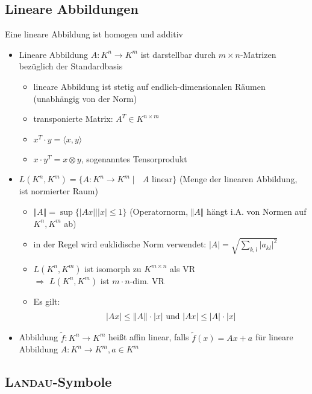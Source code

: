 \subsection{Lineare Abbildungen}
Eine lineare Abbildung ist homogen und additiv
\begin{itemize}
	\item Lineare Abbildung $A: K^n \rightarrow K^m$ ist darstellbar durch $m\times n$-Matrizen bezüglich der Standardbasis 
	\begin{itemize}
		\item lineare Abbildung ist stetig auf endlich-dimensionalen Räumen (unabhängig von der Norm)
		\item transponierte Matrix: $A^T\in K^{n\times m}$
		\item $x^T\cdot y = \langle x,y\rangle$
		\item $x\cdot y^T = x\otimes y$, sogenanntes Tensorprodukt
	\end{itemize}	
	 \item $L(K^n,K^m) = \{ A: K^n \to K^m\mid \text{ $A$ linear}\}$ (Menge der linearen Abbildung, ist normierter Raum)
	\begin{itemize}
		 \item $\Vert A\Vert= \sup\{ \vert Ax\vert \mid \vert x \vert \le 1 \}$ (Operatornorm, $\Vert A \Vert$ hängt i.A. von Normen auf $K^n, K^m$ ab)
		 \item in der Regel wird euklidische Norm verwendet: $\vert A \vert = \sqrt{\sum_{k,l} \vert a_{kl} \vert^2}$
		 \item $L(K^n, K^m)$ ist isomorph zu $K^{m\times n}$ als VR \\
		 $\Rightarrow$ $L(K^n, K^m)$ ist $m\cdot n$-dim. VR
		 \item Es gilt: 
		 \begin{align}
		 	\vert Ax \vert \le \Vert A \Vert\cdot \vert x \vert \text{ und } \vert Ax\vert \le \vert A \vert \cdot\vert x \vert\notag
		 \end{align}
	\end{itemize}
	\item Abbildung $\tilde{f}: K^n \to K^m$ heißt affin linear, falls $\tilde{f}(x) = Ax + a$ für lineare Abbildung $A:K^n\to K^m, a\in K^m$
\end{itemize}

\subsection{\textsc{Landau}-Symbole}


